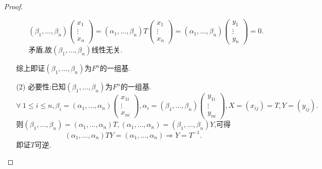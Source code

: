 \documentclass{article}
\begin{document}
\begin{enumerate}
\begin{proof}
\begin{enumerate}
\begin{enumerate}
                \[
                    (\beta_1,\ldots,\beta_n)
                    \begin{pmatrix}
                        x_1\\
                        \vdots\\
                        x_n
                    \end{pmatrix}
                    =(\alpha_1,\ldots,\beta_n)T
                    \begin{pmatrix}
                        x_1\\
                        \vdots\\
                        x_n
                    \end{pmatrix}
                    =(\alpha_1,\ldots,\beta_n)
                    \begin{pmatrix}
                        y_1\\
                        \vdots\\
                        y_n
                    \end{pmatrix}=0.
                \]
                矛盾,故$(\beta_1,\ldots,\beta_n)$线性无关.
            \end{enumerate}
            综上即证$(\beta_1,\ldots,\beta_n)$为$F^n$的一组基.
            \item [(2)]必要性:已知$(\beta_1,\ldots,\beta_n)$为$F^n$的一组基.
            \[
                \forall\ 1\leqslant i\leqslant n,
                \beta_i=(\alpha_1,\ldots,\alpha_n)
                \begin{pmatrix}
                    x_{1i}\\
                    \vdots\\
                    x_{ni}
                \end{pmatrix},
                \alpha_i=(\beta_1,\ldots,\beta_n)
                \begin{pmatrix}
                    y_{1i}\\
                    \vdots\\
                    y_{ni}
                \end{pmatrix},
                X=(x_{ij})=T,Y=(y_{ij}).
            \]
            则$(\beta_1,\ldots,\beta_n)=(\alpha_1,\ldots,\alpha_n)T,(\alpha_1,\ldots,\alpha_n)=(\beta_1,\ldots,\beta_n)Y$,可得
            \[
                (\alpha_1,\ldots,\alpha_n)TY=(\alpha_1,\ldots,\alpha_n)
                \Rightarrow
                Y=T^{-1}.
            \]
            即证$T$可逆.
        \end{enumerate}

\end{proof}
\end{enumerate}
\end{document}
